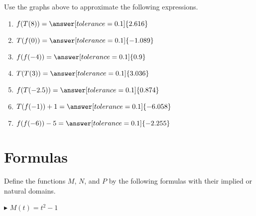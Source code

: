 \documentclass{ximera}
\begin{document}
\begin{question}


Use the graphs above to approximate the following expressions.



\begin{enumerate}

\item $f(T(8)) = \answer[tolerance=0.1]{2.616}$ \\

\item $T(f(0)) = \answer[tolerance=0.1]{-1.089}$ \\

\item $f(f(-4)) = \answer[tolerance=0.1]{0.9}$ \\

\item $T(T(3)) = \answer[tolerance=0.1]{3.036}$ \\

\item $f(T(-2.5)) = \answer[tolerance=0.1]{0.874}$ \\

\item $T(f(-1))+1 = \answer[tolerance=0.1]{-6.058}$ \\

\item $f(f(-6)) -5 = \answer[tolerance=0.1]{-2.255}$ \\

\end{enumerate}



\end{question}

















\section{Formulas}


Define the functions $M$, $N$, and $P$ by the following formulas with their implied or natural domains.

$\blacktriangleright$  $M(t) = t^2 - 1$ \\
\end{document}
